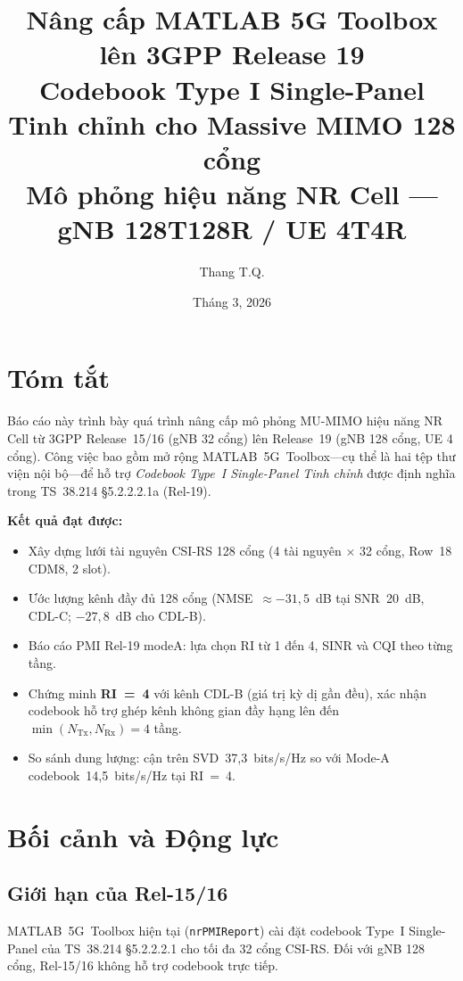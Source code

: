 \documentclass[11pt,a4paper]{article}
\title{
  \Large\textbf{Nâng cấp MATLAB 5G Toolbox lên 3GPP Release 19}\\[0.4em]
  \large Codebook Type I Single-Panel Tinh chỉnh cho Massive MIMO 128 cổng\\[0.4em]
  \normalsize Mô phỏng hiệu năng NR Cell --- gNB 128T128R / UE 4T4R
}
\author{Thang T.Q.}
\date{Tháng 3, 2026}
\begin{document}
\maketitle
\tableofcontents
\newpage

\section{Tóm tắt}

Báo cáo này trình bày quá trình nâng cấp mô phỏng MU-MIMO hiệu năng NR Cell
từ 3GPP Release~15/16 (gNB 32 cổng) lên Release~19 (gNB 128 cổng, UE 4 cổng).
Công việc bao gồm mở rộng MATLAB~5G~Toolbox---cụ thể là hai tệp thư viện nội
bộ---để hỗ trợ \emph{Codebook Type~I Single-Panel Tinh chỉnh} được định nghĩa
trong TS~38.214 \S5.2.2.2.1a (Rel-19).

\medskip
\noindent\textbf{Kết quả đạt được:}
\begin{itemize}
  \item Xây dựng lưới tài nguyên CSI-RS 128 cổng (4 tài nguyên $\times$ 32 cổng,
        Row~18 CDM8, 2 slot).
  \item Ước lượng kênh đầy đủ 128 cổng (NMSE~$\approx -31{,}5$~dB tại SNR~20~dB,
        CDL-C; $-27{,}8$~dB cho CDL-B).
  \item Báo cáo PMI Rel-19 modeA: lựa chọn RI từ 1 đến 4, SINR và CQI theo từng tầng.
  \item Chứng minh \textbf{RI~=~4} với kênh CDL-B (giá trị kỳ dị gần đều),
        xác nhận codebook hỗ trợ ghép kênh không gian đầy hạng
        lên đến $\min(N_\text{Tx},N_\text{Rx}) = 4$ tầng.
  \item So sánh dung lượng: cận trên SVD~37,3~bits/s/Hz so với
        Mode-A codebook~14,5~bits/s/Hz tại RI~=~4.
\end{itemize}

\section{Bối cảnh và Động lực}

\subsection{Giới hạn của Rel-15/16}

MATLAB~5G~Toolbox hiện tại (\texttt{nrPMIReport}) cài đặt codebook Type~I
Single-Panel của TS~38.214 \S5.2.2.2.1 cho tối đa 32 cổng CSI-RS.
Đối với gNB 128 cổng, Rel-15/16 không hỗ trợ codebook trực tiếp.
\end{document}
